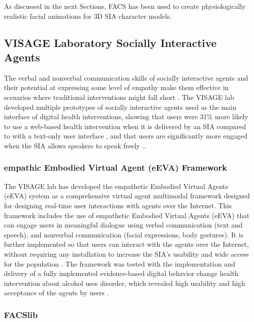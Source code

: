 \documentclass[12pt]{article}
\begin{document}
As discussed in the next Sections, FACS has been used to create physiologically realistic facial animations for 3D SIA character models.


\subsection{VISAGE Laboratory Socially Interactive Agents}

The verbal and nonverbal communication skills  of  socially interactive agents and their potential at expressing some level of empathy make them effective in scenarios where traditional interventions might fall short \cite{Lisetti2013}.  
The VISAGE lab developed multiple prototypes of socially interactive agents used as the main interface of digital health interventions, showing that users were  31\% more likely to use a web-based health intervention when it is delivered by an SIA compared to with a text-only user interface \cite{Lisetti2013}, and that users are significantly more engaged when the SIA allows speakers to speak freely \cite{LisettiNowExperience}.\cite{Yasavur2014}. 

\subsubsection{empathic Embodied Virtual Agent (eEVA) Framework}
The VISAGE lab has developed the empathetic Embodied Virtual Agents (eEVA) system as 
 a comprehensive virtual agent multimodal framework designed for designing real-time user interactions with agents over the Internet. This framework includes the use of empathetic Embodied Virtual Agents (eEVA) that can engage users in meaningful dialogue using verbal communication (text and speech), and nonverbal communication (facial expressions, body gestures).  It is further implemented so that users can interact with the agents over the Internet, without requiring any installation to increase the SIA's usability and wide access for the population  \cite{PolceanuTimeCONCEPTS}.  The framework was tested with the implementation and delivery of a fully implemented evidence-based digital behavior change health intervention about alcohol uses disorder, which revealed high usability and high acceptance of the agents by users \cite{Amini2021a}\cite{Amini2015}.

\subsubsection{FACSlib}
\label{sec:facslib}
\end{document}
